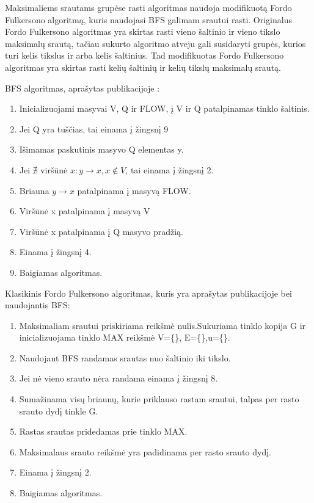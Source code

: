 Maksimaliems srautams grupėse rasti algoritmas naudoja modifikuotą Fordo Fulkersono algoritmą, kuris naudojasi BFS \cite{BFS} galimam srautui rasti. Originalus Fordo Fulkersono algoritmas \cite{FiN} yra skirtas rasti vieno šaltinio ir vieno tikslo maksimalų srautą, tačiau sukurto algoritmo atveju gali susidaryti grupės, kurios turi kelis tikslus ir arba kelis šaltinius. Tad modifikuotas Fordo Fulkersono algoritmas yra skirtas rasti kelių šaltinių ir kelių tikslų maksimalų srautą.

BFS algoritmas, aprašytas publikacijoje :
\begin{enumerate}
	\item Inicializuojami masyvai V, Q ir FLOW, į V ir Q patalpinamas tinklo šaltinis.
	\item Jei Q yra tuščias, tai einama į žingsnį 9
	\item Išimamas paskutinis masyvo Q elementas y.
	\item Jei $\nexists$ viršūnė $x : y \rightarrow x, x \notin V$, tai einama į žingsnį 2. 
	\item Briauna $y  \rightarrow x$ patalpinama į masyvą FLOW. 
	\item Viršūnė x patalpinama į masyvą V
	\item Viršūnė x patalpinama į Q masyvo pradžią. 
	\item Einama į žingsnį 4. 
	\item Baigiamas algoritmas.
\end{enumerate}

Klasikinis Fordo Fulkersono algoritmas, kuris yra aprašytas publikacijoje bei naudojantis BFS:
\begin{enumerate}
	\item Maksimaliam srautui priskiriama reikšmė nulis.Sukuriama tinklo kopija G ir inicializuojama tinklo MAX reikšmė {V=\{\}, E=\{\},u=\{\}}.
	\item Naudojant BFS randamas srautas nuo šaltinio iki tikslo.
	\item Jei nė vieno srauto nėra randama einama į žingsnį 8.
	\item Sumažinama visų briaunų, kurie priklauso rastam srautui, talpas per rasto srauto dydį tinkle G.
	\item Rastas srautas pridedamas prie tinklo MAX.
	\item Maksimalaus srauto reikšmė yra padidinama per rasto srauto dydį.
	\item Einama į žingsnį 2.
	\item Baigiamas algoritmas.
\end{enumerate}

